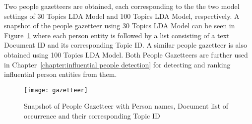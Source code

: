Two people gazetteers are obtained, each corresponding to the the two model settings of 30 Topics LDA Model and 100 Topics LDA Model, respectively. A snapshot of the people gazetteer using 30 Topics LDA Model can be seen in Figure~\ref{figure:gazette} where each person entity is followed by a list consisting of a text Document ID and its corresponding Topic ID. A similar people gazetteer is also obtained using 100 Topics LDA Model. Both People Gazetteers are further used in Chapter~\ref{chapter:influential people detection} for detecting and ranking influential person entities from them.
\begin{figure}[!h]
\centering
\texttt{[image: gazetteer]}
\caption{Snapshot of People Gazetteer with Person names, Document list of occurrence and their corresponding Topic ID}
\label{figure:gazette}
\end{figure} 

